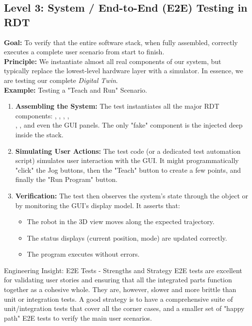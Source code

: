 \subsection*{Level 3: System / End-to-End (E2E) Testing in RDT}
\label{subsec:system_testing}


\textbf{Goal:} To verify that the entire software stack, when fully assembled, correctly executes a complete user scenario from start to finish.\\
\textbf{Principle:} We instantiate almost all real components of our system, but typically replace the lowest-level hardware layer with a simulator. In essence, we are testing our complete \textit{Digital Twin}.\\
\textbf{Example:} Testing a "Teach and Run" Scenario.
        \begin{enumerate}
            \item \textbf{Assembling the System:} The test instantiates all the major RDT components: , , , ,\\ , , and even the GUI panels. The only "fake" component is the  injected deep inside the stack.
            \item \textbf{Simulating User Actions:} The test code (or a dedicated test automation script) simulates user interaction with the GUI. It might programmatically "click" the Jog buttons, then the "Teach" button to create a few points, and finally the "Run Program" button.
            \item \textbf{Verification:} The test then observes the system's state through the  object or by monitoring the GUI's display model. It asserts that:
                \begin{itemize}
                    \item The robot in the 3D view moves along the expected trajectory.
                    \item The status displays (current position, mode) are updated correctly.
                    \item The program executes without errors.
                \end{itemize}
        \end{enumerate}
\begin{tipbox}{Engineering Insight: E2E Tests - Strengths and Strategy}
E2E tests are excellent for validating user stories and ensuring that all the integrated parts function together as a cohesive whole. They are, however, slower and more brittle than unit or integration tests. A good strategy is to have a comprehensive suite of unit/integration tests that cover all the corner cases, and a smaller set of "happy path" E2E tests to verify the main user scenarios.
\end{tipbox}


